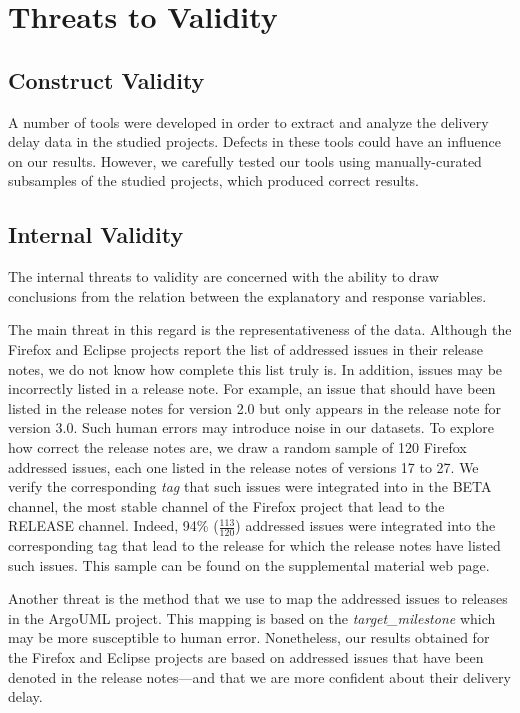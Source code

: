 \section{Threats to Validity} \label{ch4:threats}

\subsection{Construct Validity}
A number of tools were developed in order to extract and analyze the delivery
delay data in the studied projects. Defects in these tools could have an influence on
our results. However, we carefully tested our tools using manually-curated
subsamples of the studied projects, which produced correct results.

\subsection{Internal Validity}
The internal threats to validity are concerned with the ability to draw
conclusions from the relation between the explanatory and response variables.

The main threat in this regard is the representativeness of the data. Although
the Firefox and Eclipse projects report the list of addressed issues in their
release notes, we do not know how complete this list truly is. In addition,
issues may be incorrectly listed in a release note. For example, an issue that
should have been listed in the release notes for version 2.0 but only appears in
the release note for version 3.0. Such human errors may introduce noise in our
datasets. To explore how correct the release notes are, we draw a random sample
of 120 Firefox addressed issues, each one listed in the release notes of
versions 17 to 27. We verify the corresponding \textit{tag} that such issues
were integrated into in the BETA channel, \ie the most stable channel of the
Firefox project that lead to the RELEASE
channel.
Indeed, 94\% ($\frac{113}{120}$) addressed issues were integrated into the
corresponding tag that lead to the release for which the release notes have
listed such issues. This sample can be found on the supplemental material web
page.

Another threat is the method that we use to map the addressed issues to releases in
the ArgoUML project. This mapping is based on the \textit{target\_milestone}
which may be more susceptible to human error. Nonetheless, our results obtained
for the Firefox and Eclipse projects are based on addressed issues that have been
denoted in the release notes---and that we are more confident about their
delivery delay.

